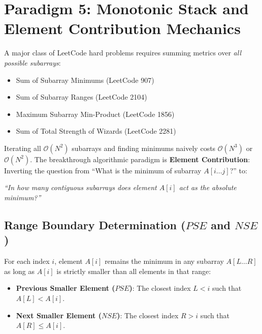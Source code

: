 \documentclass[10pt,journal,compsoc,onecolumn]{IEEEtran}
\begin{document}
\section{Paradigm 5: Monotonic Stack and Element Contribution Mechanics}
\label{sec:monotonic-stack}

A major class of LeetCode hard problems requires summing metrics over \emph{all possible subarrays}:
\begin{itemize}
    \item Sum of Subarray Minimums (LeetCode 907)
    \item Sum of Subarray Ranges (LeetCode 2104)
    \item Maximum Subarray Min-Product (LeetCode 1856)
    \item Sum of Total Strength of Wizards (LeetCode 2281)
\end{itemize}

Iterating all $\mathcal{O}(N^2)$ subarrays and finding minimums naively costs $\mathcal{O}(N^3)$ or $\mathcal{O}(N^2)$. The breakthrough algorithmic paradigm is \textbf{Element Contribution}: Inverting the question from ``What is the minimum of subarray $A[i \dots j]$?'' to:
\begin{center}
\emph{``In how many contiguous subarrays does element $A[i]$ act as the absolute minimum?''}
\end{center}

\subsection{Range Boundary Determination ($PSE$ and $NSE$)}
For each index $i$, element $A[i]$ remains the minimum in any subarray $A[L \dots R]$ as long as $A[i]$ is strictly smaller than all elements in that range:
\begin{itemize}
    \item \textbf{Previous Smaller Element ($PSE$)}: The closest index $L < i$ such that $A[L] < A[i]$.
    \item \textbf{Next Smaller Element ($NSE$)}: The closest index $R > i$ such that $A[R] \le A[i]$.
\end{itemize}
\end{document}
